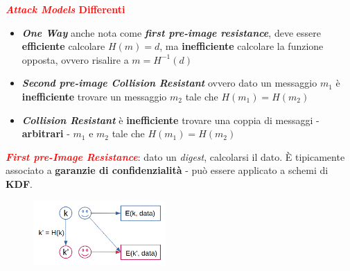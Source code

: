 \begin{flushleft}
    \textcolor{red}{\textbf{\textit{Attack Models} Differenti}}
    \begin{center}
        \begin{minipage}[c]{0.75\textwidth}
            \begin{itemize}[nosep]
                \item \textbf{\textit{One Way}} anche nota come \textbf{\textit{first pre-image resistance}}, deve essere \textbf{efficiente} calcolare $H(m) = d$, ma \textbf{inefficiente} calcolare la funzione opposta, ovvero risalire a $m = H^{-1}(d)$
                \item \textbf{\textit{Second pre-image Collision Resistant}} ovvero dato un messaggio $m_1$ è \textbf{inefficiente} trovare un messaggio $m_2$ tale che $H(m_1) = H(m_2)$
                \item \textbf{\textit{Collision Resistant}} è \textbf{inefficiente} trovare una coppia di messaggi - \textbf{arbitrari} - $m_1$ e $m_2$ tale che $H(m_1) = H(m_2)$
            \end{itemize}
        \end{minipage}
        \hfill
        \begin{minipage}[c]{0.1\textwidth}
            \centering
        \end{minipage}
    \end{center}

    \textcolor{red}{\textbf{\textit{First pre-Image Resistance}}}: dato un \textit{digest}, calcolarsi il dato. È tipicamente associato a \textbf{garanzie di confidenzialità} - può essere applicato a schemi di \textbf{KDF}.

    \begin{figure}[h]
        \centering
        \includegraphics[width=0.45\textwidth]{img/one_way.png}
    \end{figure}
    

\end{flushleft}
